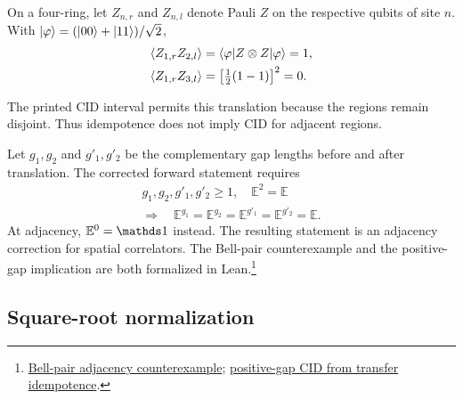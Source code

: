 \documentclass[aps,pra,reprint,nofootinbib,onecolumn]{revtex4-2}
\begin{document}
On a four-ring, let $Z_{n,r}$ and $Z_{n,l}$ denote Pauli $Z$
on the respective qubits of site $n$. With
$\lvert\varphi\rangle=(\lvert00\rangle+\lvert11\rangle)/\sqrt2$,
\begin{align}
	\langle Z_{1,r}Z_{2,l}\rangle
	 & =\langle\varphi\rvert Z\otimes Z\lvert\varphi\rangle=1,\nonumber \\
	\langle Z_{1,r}Z_{3,l}\rangle
	 & =\left[\tfrac12(1-1)\right]^2=0.
	\label{eq:bell-correlations}
\end{align}
\begin{refutation}
	The printed CID interval permits this translation because the regions
	remain disjoint. Thus idempotence does not imply CID for adjacent regions.
\end{refutation}

Let $g_1,g_2$ and $g'_1,g'_2$ be the complementary gap lengths
before and after translation. The corrected forward statement
requires
\begin{align}
	g_1,g_2,g'_1,g'_2\geq1,\quad \mathbb E^2=\mathbb E\nonumber \\
	\Longrightarrow\quad
	\mathbb E^{g_1}=\mathbb E^{g_2}
	=\mathbb E^{g'_1}=\mathbb E^{g'_2}=\mathbb E.
	\label{eq:positive-gaps}
\end{align}
At adjacency, $\mathbb E^0=\Id$ instead. The resulting statement
is an adjacency correction for spatial correlators. The Bell-pair
counterexample and the positive-gap implication are both formalized in Lean.\footnote{\href{https://sirui-lu.com/TNLean/docs/TNLean/MPS/RFP/BellPairCIDObstruction.html\#MPSTensor.bellPairChain_isNormalTensor_isTransferIdempotent_and_not_isPhysicalCID}{Bell-pair adjacency counterexample}; \href{https://sirui-lu.com/TNLean/docs/TNLean/MPS/RFP/ZeroCorrelationLength.html\#MPSTensor.isPositiveGapPhysicalCID_of_isTransferIdempotent}{positive-gap CID from transfer idempotence}.}

\subsection{Square-root normalization}
\end{document}

